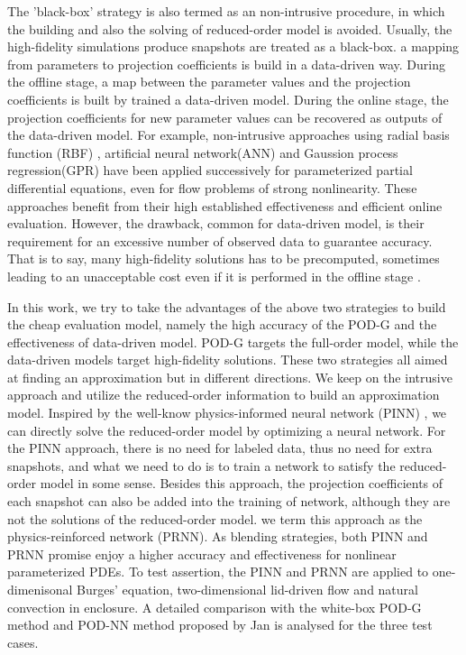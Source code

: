 \documentclass[preprint, 10pt]{elsarticle}
\begin{document}
The 'black-box' strategy is also termed as an non-intrusive procedure, in which the building and also the solving of reduced-order model is avoided. Usually, the high-fidelity simulations produce snapshots are treated as a black-box.
a mapping from parameters to projection coefficients is build in a data-driven way. During the offline stage, a map between the parameter values and the projection coefficients is built by trained a data-driven model. During the online stage, the projection coefficients for new parameter values can be recovered as outputs of the data-driven model.  For example, non-intrusive approaches using radial basis function (RBF) \cite{chen2018greedy, walton2013reduced, xiao2015non}, artificial neural network(ANN) \cite{hesthaven2018non} and Gaussion process regression(GPR) \cite{guo2019data} have been applied successively for parameterized partial differential equations, even for flow problems of strong nonlinearity. These approaches benefit from their high established effectiveness and efficient online evaluation. However, the drawback, common for data-driven model, is their requirement for an excessive number of observed data to guarantee accuracy. That is to say, many high-fidelity solutions has to be precomputed,  sometimes leading to an unacceptable cost even if it is performed in the offline stage \cite{hesthaven2018non}.

In this work, we try to take the advantages of the above two strategies to build the cheap evaluation model, namely the high accuracy of the POD-G and the effectiveness of  data-driven model. POD-G targets the full-order model, while the data-driven models target high-fidelity solutions. These two strategies all aimed at finding an approximation but in different directions.
We keep on the intrusive approach and utilize the reduced-order information to build an approximation model. Inspired by the well-know physics-informed neural network (PINN) \cite{raissi2019physics, raissi2020hidden, mao2020physics}, we can directly solve the reduced-order model by  optimizing a neural network. For the PINN approach, there is no need for labeled data, thus no need for extra snapshots, and what we need to do is to train a network to satisfy the reduced-order model in some sense. Besides this approach, the projection coefficients of each snapshot can also be added into the training of network, although they are not the solutions of the reduced-order model. we term this approach as the physics-reinforced network (PRNN). As blending strategies, both PINN and PRNN promise enjoy a higher accuracy and effectiveness for nonlinear parameterized PDEs. To test assertion, the PINN and PRNN are applied to one-dimenisonal Burges' equation, two-dimensional lid-driven flow and natural convection in enclosure. A detailed comparison with the white-box POD-G method and POD-NN method proposed by Jan \cite{hesthaven2018non} is analysed for the three test cases.
\end{document}
